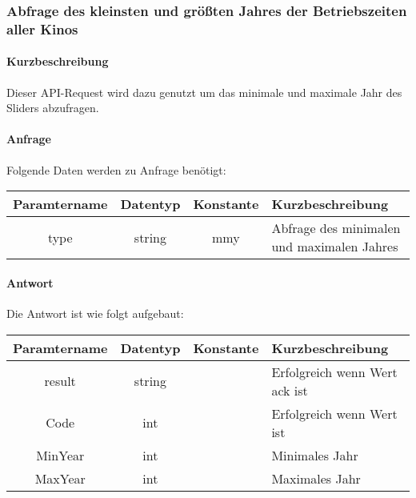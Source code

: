\subsubsection{Abfrage des kleinsten und größten Jahres der Betriebszeiten aller Kinos}
\paragraph{Kurzbeschreibung}Dieser API-Request wird dazu genutzt um das minimale und maximale Jahr des Sliders abzufragen.
\paragraph{Anfrage}Folgende Daten werden zu Anfrage benötigt:
\begin{table}[H]
	\begin{tabular}{|c|c|c|p{6.5cm}|}
		\hline
		\textbf{Paramtername} & \textbf{Datentyp} & \textbf{Konstante} & \textbf{Kurzbeschreibung}                                                                                               \\ \hline
		type                & string            & mmy                & Abfrage des minimalen und maximalen Jahres \\ \hline
	\end{tabular}
\end{table}
\paragraph{Antwort}Die Antwort ist wie folgt aufgebaut:
\begin{table}[H]
	\begin{tabular}{|c|c|c|p{6.5cm}|}
		\hline
		\textbf{Paramtername} & \textbf{Datentyp} & \textbf{Konstante} & \textbf{Kurzbeschreibung}                                                                                               \\ \hline
		result              & string           &                 & Erfolgreich wenn Wert {\glqq ack\grqq} ist \\ \hline
		Code                & int              &                 & Erfolgreich wenn Wert {\glqq 0\grqq} ist \\ \hline
		MinYear             & int              &                 & Minimales Jahr \\ \hline
		MaxYear             & int              &                 & Maximales Jahr \\ \hline
	\end{tabular}
\end{table}
